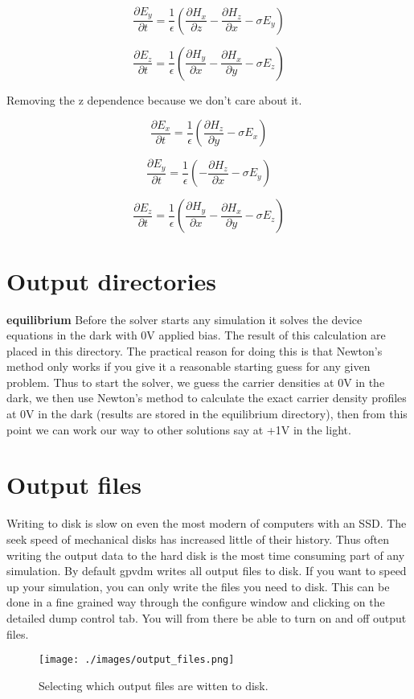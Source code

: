 \documentclass[11pt]{article}
\begin{document}
\begin{equation}
\frac{\partial E_y}{\partial t}= \frac{1}{\epsilon}(\frac{\partial H_x}{\partial z}-\frac{\partial H_z}{\partial x}-\sigma E_y) 
\end{equation}

\begin{equation}
\frac{\partial E_z}{\partial t}= \frac{1}{\epsilon}(\frac{\partial H_y}{\partial x}-\frac{\partial H_x}{\partial y}-\sigma E_z) 
\end{equation}

Removing the z dependence because we don't care about it.

\begin{equation}
\frac{\partial E_x}{\partial t}= \frac{1}{\epsilon}(\frac{\partial H_z}{\partial y}-\sigma E_x) 
\end{equation}

\begin{equation}
\frac{\partial E_y}{\partial t}= \frac{1}{\epsilon}(-\frac{\partial H_z}{\partial x}-\sigma E_y) 
\end{equation}

\begin{equation}
\frac{\partial E_z}{\partial t}= \frac{1}{\epsilon}(\frac{\partial H_y}{\partial x}-\frac{\partial H_x}{\partial y}-\sigma E_z) 
\end{equation}




\appendix
{}
\section{Output directories}
\textbf{equilibrium}\newline
Before the solver starts any simulation it solves the device equations in the dark with 0V applied bias.  The result of this calculation are placed in this directory.  The practical reason for doing this is that Newton's method only works if you give it a reasonable starting guess for any given problem.  Thus to start the solver, we guess the carrier densities at 0V in the dark, we then use Newton's method to calculate the exact carrier density profiles at 0V in the dark (results are stored in the equilibrium directory), then from this point we can work our way to other solutions say at +1V in the light.
\newline

\section{Output files}
Writing to disk is slow on even the most modern of computers with an SSD.  The seek speed of mechanical disks has increased little of their history.  Thus often writing the output data to the hard disk is the most time consuming part of any simulation.  By default gpvdm writes all output files to disk.  If you want to speed up your simulation, you can only write the files you need to disk.  This can be done in a fine grained way through the configure window and clicking on the detailed dump control tab.  You will from there be able to turn on and off output files.

\begin{figure}
\centering
\texttt{[image: ./images/output\_files.png]}
\caption{Selecting which output files are witten to disk.}
\end{figure}


\end{document}
